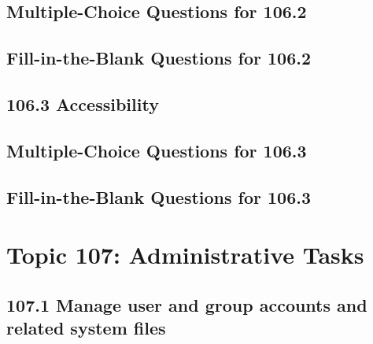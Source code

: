 \documentclass[a4paper]{report}
\begin{document}
\section*{Multiple-Choice Questions for 106.2}

\newpage
\section*{Fill-in-the-Blank Questions for 106.2}

\newpage
\section*{106.3 Accessibility}

\newpage
\section*{Multiple-Choice Questions for 106.3}

\newpage
\section*{Fill-in-the-Blank Questions for 106.3}


\newpage
\chapter{Topic 107: Administrative Tasks}

\newpage
\section*{107.1 Manage user and group accounts and related system files}
\end{document}
